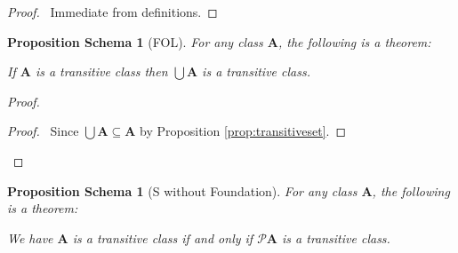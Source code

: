 \documentclass{book}
\let\qed\relax
\newtheorem{props}[ax]{Proposition Schema}
\theoremstyle{definition}
\begin{document}
\begin{proof}
\pf\ Immediate from definitions. \qed
\end{proof}

\begin{props}[FOL]
\label{prop:uniontransitive}
For any class $\mathbf{A}$, the following is a theorem:

If $\mathbf{A}$ is a transitive class then $\bigcup \mathbf{A}$ is a transitive class.
\end{props}

\begin{proof}
\pf
{}
\begin{proof}
	\pf\ Since $\bigcup \mathbf{A} \subseteq \mathbf{A}$ by Proposition \ref{prop:transitiveset}.
\end{proof}
\qed
\end{proof}

\begin{props}[S without Foundation]
\label{prop:powtransitive}
For any class $\mathbf{A}$, the following is a theorem:

We have $\mathbf{A}$ is a transitive class if and only if $\mathcal{P} \mathbf{A}$ is a transitive class.
\end{props}
\end{document}
